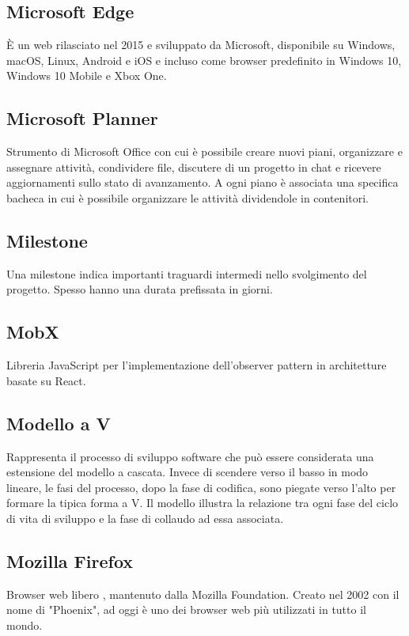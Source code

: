 \subsection*{Microsoft Edge}
È un  web rilasciato nel 2015 e sviluppato da Microsoft, disponibile su Windows, macOS, Linux, Android e iOS e incluso come browser predefinito in Windows 10, Windows 10 Mobile e Xbox One. 

\subsection*{Microsoft Planner}
Strumento di Microsoft Office con cui è possibile creare nuovi piani, organizzare e assegnare attività, condividere file, discutere di un progetto in chat e ricevere aggiornamenti sullo stato di avanzamento.
A ogni piano è associata una specifica bacheca in cui è possibile organizzare le attività dividendole in contenitori.

\subsection*{Milestone}
Una milestone indica importanti traguardi intermedi nello svolgimento del progetto. Spesso hanno una durata prefissata in giorni.

\subsection*{MobX}
Libreria JavaScript per l'implementazione dell'observer pattern in architetture basate su React.

\subsection*{Modello a V}
Rappresenta il processo di sviluppo software che può essere considerata una estensione del modello a cascata. Invece di scendere verso il basso in modo lineare, le fasi del processo, dopo la fase di codifica, sono piegate verso l'alto per formare la tipica forma a V. Il modello illustra la relazione tra ogni fase del ciclo di vita di sviluppo e la fase di collaudo ad essa associata.

\subsection*{Mozilla Firefox}
Browser web libero , mantenuto dalla Mozilla Foundation. Creato nel 2002 con il nome di "Phoenix", ad oggi è uno dei browser web più utilizzati in tutto il mondo.

